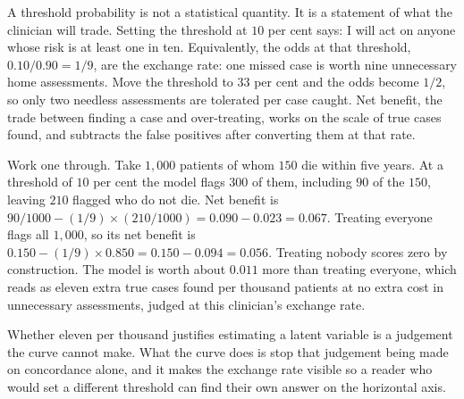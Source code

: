 \begin{reading}
A threshold probability is not a statistical quantity. It is a statement of what the clinician will trade. Setting the threshold at $10$ per cent says: I will act on anyone whose risk is at least one in ten. Equivalently, the odds at that threshold, $0.10/0.90=1/9$, are the exchange rate: one missed case is worth nine unnecessary home assessments. Move the threshold to $33$ per cent and the odds become $1/2$, so only two needless assessments are tolerated per case caught. Net benefit, the trade between finding a case and over-treating, works on the scale of true cases found, and subtracts the false positives after converting them at that rate.

Work one through. Take $1{,}000$ patients of whom $150$ die within five years. At a threshold of $10$ per cent the model flags $300$ of them, including $90$ of the $150$, leaving $210$ flagged who do not die. Net benefit is $90/1000-(1/9)\times(210/1000)=0.090-0.023=0.067$. Treating everyone flags all $1{,}000$, so its net benefit is $0.150-(1/9)\times0.850=0.150-0.094=0.056$. Treating nobody scores zero by construction. The model is worth about $0.011$ more than treating everyone, which reads as eleven extra true cases found per thousand patients at no extra cost in unnecessary assessments, judged at this clinician's exchange rate.

Whether eleven per thousand justifies estimating a latent variable is a judgement the curve cannot make. What the curve does is stop that judgement being made on concordance alone, and it makes the exchange rate visible so a reader who would set a different threshold can find their own answer on the horizontal axis.
\end{reading}

